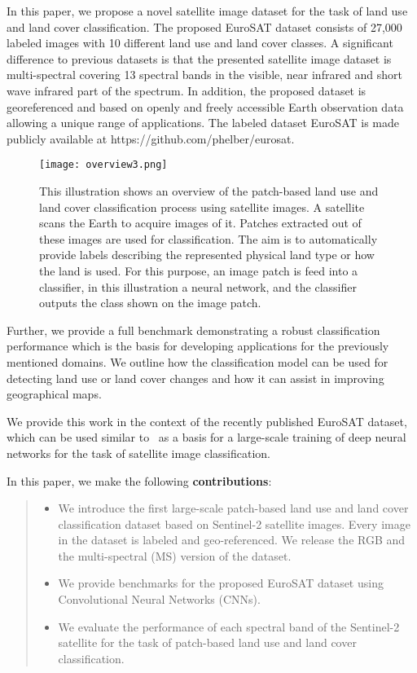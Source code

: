 \documentclass[journal]{IEEEtran}
\begin{document}
In this paper, we propose a novel satellite image dataset for the task of land use and land cover classification. The proposed EuroSAT dataset consists of 27,000 labeled images with 10 different land use and land cover classes. A significant difference to previous datasets is that the presented satellite image dataset is multi-spectral covering 13 spectral bands in the visible, near infrared and short wave infrared part of the spectrum. In addition, the proposed dataset is georeferenced and based on openly and freely accessible Earth observation data allowing a unique range of applications. The labeled dataset EuroSAT is made publicly available at https://github.com/phelber/eurosat. 
\begin{figure*}
	\centering
	\texttt{[image: overview3.png]}
	\caption{This illustration shows an overview of the patch-based land use and land cover classification process using satellite images. A satellite scans the Earth to acquire images of it. Patches extracted out of these images are used for classification. The aim is to automatically provide labels describing the represented physical land type or how the land is used. For this purpose, an image patch is feed into a classifier, in this illustration a neural network, and the classifier outputs the class shown on the image patch.}
	\label{fig:overview}
\end{figure*}
Further, we provide a full benchmark demonstrating a robust classification performance which is the basis for developing applications for the previously mentioned domains. We outline how the classification model can be used for detecting land use or land cover changes and how it can assist in improving geographical maps. 

We provide this work in the context of the recently published EuroSAT dataset, which can be used similar to~\cite{ni2015large} as a basis for a large-scale training of deep neural networks for the task of satellite image classification.

In this paper, we make the following \textbf{contributions}:
\begin{quote}
\begin{itemize}
\item We introduce the first large-scale patch-based land use and land cover classification dataset based on Sentinel-2 satellite images. Every image in the dataset is labeled and geo-referenced. We release the RGB and the multi-spectral (MS) version of the dataset.
\item We provide benchmarks for the proposed EuroSAT dataset using Convolutional Neural Networks (CNNs).
\item We evaluate the performance of each spectral band of the Sentinel-2 satellite for the task of patch-based land use and land cover classification.
\end{itemize}
\end{quote}
\end{document}

